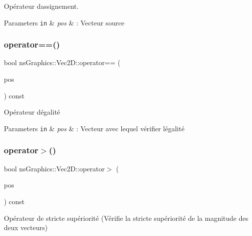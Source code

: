 Opérateur d\textquotesingle{}assignement. 


\begin{DoxyParams}[1]{Parameters}
\mbox{\tt in}  & {\em pos} & \+: Vecteur source \\
\hline
\end{DoxyParams}
\mbox{\label{classns_graphics_1_1_vec2_d_a94b4b8420a450dd284311c49cb0b2e6b}} 
\subsubsection{\texorpdfstring{operator==()}{operator==()}}
{\footnotesize\ttfamily bool ns\+Graphics\+::\+Vec2\+D\+::operator== (\begin{DoxyParamCaption}\item[{const \hyperlink{classns_graphics_1_1_vec2_d}{Vec2D} \&}]{pos }\end{DoxyParamCaption}) const}



Opérateur d\textquotesingle{}égalité 


\begin{DoxyParams}[1]{Parameters}
\mbox{\tt in}  & {\em pos} & \+: Vecteur avec lequel vérifier l\textquotesingle{}égalité \\
\hline
\end{DoxyParams}
\mbox{\label{classns_graphics_1_1_vec2_d_a30da0e7984d8c3e7a66bbdcdcc24c9cb}} 
\subsubsection{\texorpdfstring{operator$>$()}{operator>()}}
{\footnotesize\ttfamily bool ns\+Graphics\+::\+Vec2\+D\+::operator$>$ (\begin{DoxyParamCaption}\item[{const \hyperlink{classns_graphics_1_1_vec2_d}{Vec2D} \&}]{pos }\end{DoxyParamCaption}) const}



Opérateur de stricte supériorité (Vérifie la stricte supériorité de la magnitude des deux vecteurs) 


